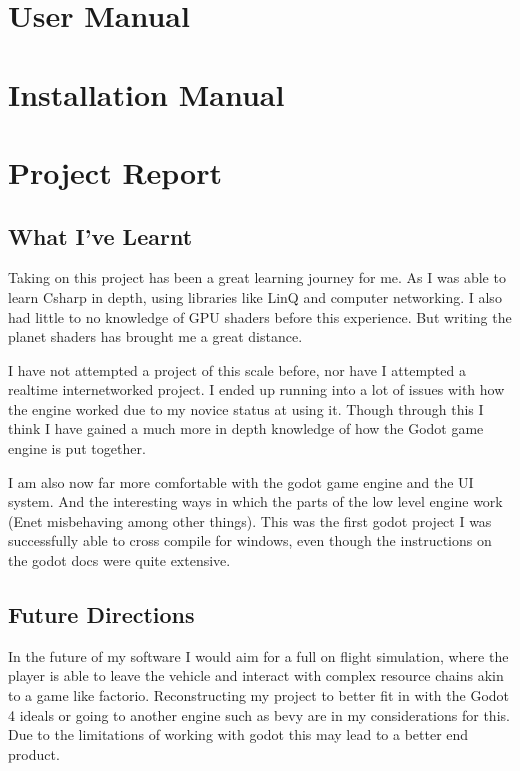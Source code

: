 \documentclass[12pt, DIV=calc]{scrartcl}
\begin{document}
\clearpage
\section{User Manual}




\clearpage
\section{Installation Manual}




\clearpage
\section{Project Report}
\subsection{What I've Learnt}
Taking on this project has been a great learning journey for me. As I was able to learn Csharp in depth, using libraries like LinQ and computer networking. I also had little to no knowledge of GPU shaders before this experience. But writing the planet shaders has brought me a great distance. 

I have not attempted a project of this scale before, nor have I attempted a realtime internetworked project. I ended up running into a lot of issues with how the engine worked due to my novice status at using it. Though through this I think I have gained a much more in depth knowledge of how the Godot game engine is put together. 

I am also now far more comfortable with the godot game engine and the UI system. And the interesting ways in which the parts of the low level engine work (Enet misbehaving among other things). This was the first godot project I was successfully able to cross compile for windows, even though the instructions on the godot docs were quite extensive.


\subsection{Future Directions}
In the future of my software I would aim for a full on flight simulation, where the player is able to leave the vehicle and interact with complex resource chains akin to a game like factorio. Reconstructing my project to better fit in with the Godot 4 ideals or going to another engine such as bevy are in my considerations for this. Due to the limitations of working with godot this may lead to a better end product.\\
\end{document}
